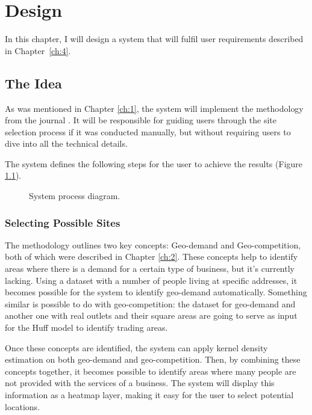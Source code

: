 \chapter{Design}
\label{ch:5}

In this chapter, I will design a system that will fulfil user requirements described in Chapter~\ref{ch:4}.

\section{The Idea}
\label{sec:idea}

As was mentioned in Chapter \ref{ch:1}, the system will implement the methodology from the journal \cite{roig2013retail}. It will be responsible for guiding users through the site selection process if it was conducted manually, but without requiring users to dive into all the technical details.

The system defines the following steps for the user to achieve the results (Figure \ref{fig:system-process-diagram}).

\begin{figure}[ht]\centering
  \centering
  
  \caption{System process diagram.}
  \label{fig:system-process-diagram}
\end{figure}

\subsection{Selecting Possible Sites}

The methodology outlines two key concepts: Geo-demand and Geo-competition, both of which were described in Chapter \ref{ch:2}. These concepts help to identify areas where there is a demand for a certain type of business, but it's currently lacking. Using a dataset with a number of people living at specific addresses, it becomes possible for the system to identify geo-demand automatically. Something similar is possible to do with geo-competition: the dataset for geo-demand and another one with real outlets and their square areas are going to serve as input for the Huff model to identify trading areas.

Once these concepts are identified, the system can apply kernel density estimation on both geo-demand and geo-competition. Then, by combining these concepts together, it becomes possible to identify areas where many people are not provided with the services of a business. The system will display this information as a heatmap layer, making it easy for the user to select potential locations.

